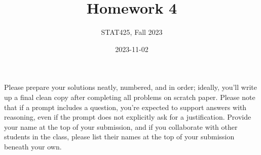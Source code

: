 \documentclass[
  letterpaper,
  DIV=11,
  numbers=noendperiod]{scrartcl}
\title{Homework 4}
\author{STAT425, Fall 2023}
\date{2023-11-02}
\begin{document}
\maketitle
\pagestyle{fancy}  

\ifdefined\Shaded\renewenvironment{Shaded}{\begin{tcolorbox}[breakable, frame hidden, enhanced, boxrule=0pt, interior hidden, borderline west={3pt}{0pt}{shadecolor}, sharp corners]}{\end{tcolorbox}}\fi

Please prepare your solutions neatly, numbered, and in order; ideally,
you'll write up a final clean copy after completing all problems on
scratch paper. Please note that if a prompt includes a question, you're
expected to support answers with reasoning, even if the prompt does not
explicitly ask for a justification. Provide your name at the top of your
submission, and if you collaborate with other students in the class,
please list their names at the top of your submission beneath your own.
\end{document}
